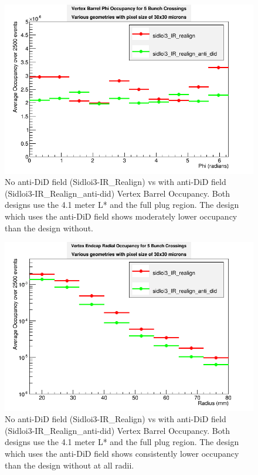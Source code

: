 \documentclass{report}
\begin{document}
                \begin{figure}[H] 
                    \includegraphics[height=.4\textheight]{VradOccupancy_base_brl}
                    \centering
                    \caption{No anti-DiD field (Sidloi3-IR\_Realign) vs with anti-DiD field 
                            (Sidloi3-IR\_Realign\_anti-did) Vertex Barrel Occupancy. Both designs use the 4.1 meter L*
                            and the full plug region. The design which uses the anti-DiD field shows moderately lower occupancy 
                            than the design without.}
                    \label{fig__did_vertex_brl}
                \end{figure}
                \begin{figure}[H] 
                    \includegraphics[height=.4\textheight]{VradOccupancy_base_ecp}
                    \centering
                    \caption{No anti-DiD field (Sidloi3-IR\_Realign) vs with anti-DiD field 
                            (Sidloi3-IR\_Realign\_anti-did) Vertex Barrel Occupancy. Both designs use the 4.1 meter L*
                            and the full plug region. The design which uses the anti-DiD field shows consistently lower occupancy 
                            than the design without at all radii.}
                    \label{fig__did_vertex_ecp}
                \end{figure}
\end{document}
